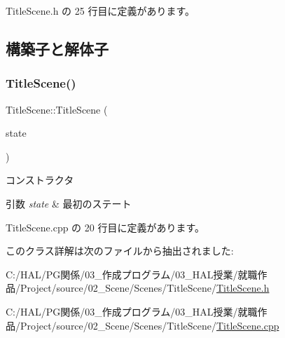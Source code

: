  Title\+Scene.\+h の 25 行目に定義があります。



\subsection{構築子と解体子}
\mbox{\label{class_title_scene_a433ef854689b1c9defb29d9f999c52da}} 
\subsubsection{\texorpdfstring{Title\+Scene()}{TitleScene()}}
{\footnotesize\ttfamily Title\+Scene\+::\+Title\+Scene (\begin{DoxyParamCaption}\item[{\mbox{\hyperlink{class_scene_base_1_1_state_base}{State\+Base}} $\ast$}]{state }\end{DoxyParamCaption})}



コンストラクタ 


\begin{DoxyParams}{引数}
{\em state} & 最初のステート \\
\hline
\end{DoxyParams}


 Title\+Scene.\+cpp の 20 行目に定義があります。



このクラス詳解は次のファイルから抽出されました\+:\begin{DoxyCompactItemize}
\item 
C\+:/\+H\+A\+L/\+P\+G関係/03\+\_\+作成プログラム/03\+\_\+\+H\+A\+L授業/就職作品/\+Project/source/02\+\_\+\+Scene/\+Scenes/\+Title\+Scene/\mbox{\hyperlink{_title_scene_8h}{Title\+Scene.\+h}}\item 
C\+:/\+H\+A\+L/\+P\+G関係/03\+\_\+作成プログラム/03\+\_\+\+H\+A\+L授業/就職作品/\+Project/source/02\+\_\+\+Scene/\+Scenes/\+Title\+Scene/\mbox{\hyperlink{_title_scene_8cpp}{Title\+Scene.\+cpp}}\end{DoxyCompactItemize}
